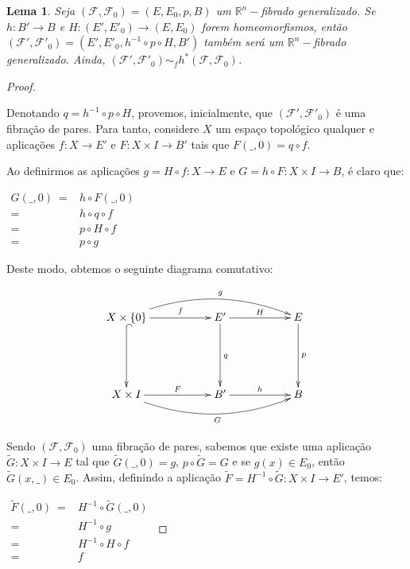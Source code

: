 \documentclass[12pt,oneside]{book} %
\newtheorem{lem}    {\hspace{0.5cm}Lema}[chapter]
\newcommand{\R}{\mathbb{R}}
\newcommand{\wt}{\widetilde}
\begin{document}
\begin{lem}\label{iso_homot_2}
	Seja $(\mathcal{F},\mathcal{F}_{0})=(E,E_{0},p,B)$ um $\R^{n}-$fibrado generalizado. Se $h:B'\to B$ e $H:(E',E'_{0})\to (E,E_{0})$ forem homeomorfismos, então $(\mathcal{F'},\mathcal{F'}_{0})=(E',E'_{0},h^{-1}\circ p\circ H,B')$ também será um $\R^{n}-$fibrado generalizado. Ainda, $(\mathcal{F'},\mathcal{F'}_{0})\sim_{f} h^{*}(\mathcal{F},\mathcal{F}_{0})$.
\end{lem}
\begin{proof}
	
	\
	
	\par Denotando $q=h^{-1}\circ p\circ H$, provemos, inicialmente, que $(\mathcal{F'},\mathcal{F'}_{0})$ é uma fibração de pares. Para tanto, considere $X$ um espaço topológico qualquer e aplicações $f:X\to E'$ e $F:X\times I\to B'$ tais que $F(\_,0)=q\circ f$.
	
	\par Ao definirmos as aplicações $g=H\circ f:X\to E$ e $G=h\circ F:X\times I\to B$, é claro que: \newline 
	
	$\begin{array}{rl}
		G(\_,0) \ = & h\circ F(\_,0) \\
		= & h\circ q\circ f \\
		= & p\circ H\circ f \\
		= & p\circ g
	\end{array}$ \newline 
	
	\par Deste modo, obtemos o seguinte diagrama comutativo:
	
	$$ \xymatrix @C=0.5cm {
		X\times \{ 0 \} \ar[rrr]^-{f} \ar@{^(->}[dd] \ar@/^0.6cm/[rrrrrr]^-{g} &&& E' \ar[rrr]^-{H} \ar[dd]^{q} &&& E \ar[dd]^-{p} \\
		&&& &&& \\
		X\times I \ar[rrr]^-{F} \ar@/_0.6cm/[rrrrrr]_-{G} &&& B' \ar[rrr]^-{h} &&& B
	} $$
	
	\par Sendo $(\mathcal{F},\mathcal{F}_{0})$ uma fibração de pares, sabemos que existe uma aplicação $\wt{G}:X\times I\to E$ tal que $\wt{G}(\_,0)=g$, $p\circ \wt{G}=G$ e se $g(x)\in E_{0}$, então $\wt{G}(x,\_)\in E_{0}$. Assim, definindo a aplicação $\wt{F}=H^{-1}\circ \wt{G}:X\times I\to E'$, temos: \newline 
	
	$\begin{array}{rl}
		\wt{F}(\_,0) \ = & H^{-1}\circ \wt{G}(\_,0) \\
		= & H^{-1}\circ g \\
		= & H^{-1}\circ H\circ f \\
		= & f
	\end{array}$
	

\end{proof}
\end{document}

